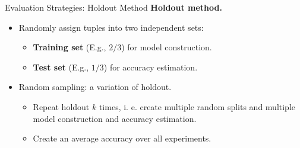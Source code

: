 \begin{frame}{Evaluation Strategies: Holdout Method}
	\textbf{Holdout method.}
	\begin{itemize}
		\item Randomly assign tuples into two independent sets:
		      \begin{itemize}
			      \item \textbf{\color{airforceblue}Training set} (E.g., $2/3$) for model construction.
			      \item \textbf{\color{airforceblue}Test set} (E.g., $1/3$) for accuracy estimation.
		      \end{itemize}
		\item Random sampling: a variation of holdout.
		      \begin{itemize}
			      \item Repeat holdout $k$ times, i. e. create multiple random splits and
			            multiple model construction and accuracy estimation.
			      \item Create an average accuracy over all experiments.
		      \end{itemize}
	\end{itemize}

\end{frame}

